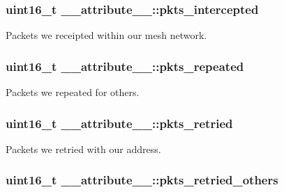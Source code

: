 \subsubsection[{\texorpdfstring{pkts\+\_\+intercepted}{pkts_intercepted}}]{\setlength{\rightskip}{0pt plus 5cm}uint16\+\_\+t \+\_\+\+\_\+attribute\+\_\+\+\_\+\+::pkts\+\_\+intercepted}\hypertarget{struct____attribute_____a8483976361231cd091d9f0138fef1e47}{}\label{struct____attribute_____a8483976361231cd091d9f0138fef1e47}


Packets we receipted within our mesh network. 

\subsubsection[{\texorpdfstring{pkts\+\_\+repeated}{pkts_repeated}}]{\setlength{\rightskip}{0pt plus 5cm}uint16\+\_\+t \+\_\+\+\_\+attribute\+\_\+\+\_\+\+::pkts\+\_\+repeated}\hypertarget{struct____attribute_____a209e5ba4478f5776ee65788d276d5f2c}{}\label{struct____attribute_____a209e5ba4478f5776ee65788d276d5f2c}


Packets we repeated for others. 

\subsubsection[{\texorpdfstring{pkts\+\_\+retried}{pkts_retried}}]{\setlength{\rightskip}{0pt plus 5cm}uint16\+\_\+t \+\_\+\+\_\+attribute\+\_\+\+\_\+\+::pkts\+\_\+retried}\hypertarget{struct____attribute_____a01cdbd0aa173d415d86566adef6775a3}{}\label{struct____attribute_____a01cdbd0aa173d415d86566adef6775a3}


Packets we retried with our address. 

\subsubsection[{\texorpdfstring{pkts\+\_\+retried\+\_\+others}{pkts_retried_others}}]{\setlength{\rightskip}{0pt plus 5cm}uint16\+\_\+t \+\_\+\+\_\+attribute\+\_\+\+\_\+\+::pkts\+\_\+retried\+\_\+others}\hypertarget{struct____attribute_____ae79aae50e9255af8fc03b6988c7d5e12}{}\label{struct____attribute_____ae79aae50e9255af8fc03b6988c7d5e12}


